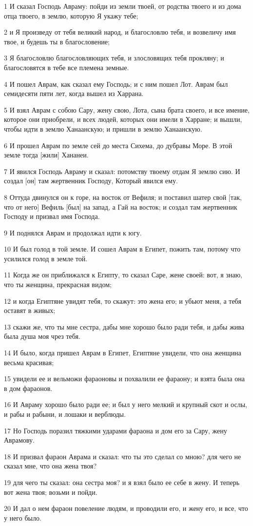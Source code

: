 \par 1 И сказал Господь Авраму: пойди из земли твоей, от родства твоего и из дома отца твоего, в землю, которую Я укажу тебе;
\par 2 и Я произведу от тебя великий народ, и благословлю тебя, и возвеличу имя твое, и будешь ты в благословение;
\par 3 Я благословлю благословляющих тебя, и злословящих тебя прокляну; и благословятся в тебе все племена земные.
\par 4 И пошел Аврам, как сказал ему Господь; и с ним пошел Лот. Аврам был семидесяти пяти лет, когда вышел из Харрана.
\par 5 И взял Аврам с собою Сару, жену свою, Лота, сына брата своего, и все имение, которое они приобрели, и всех людей, которых они имели в Харране; и вышли, чтобы идти в землю Ханаанскую; и пришли в землю Ханаанскую.
\par 6 И прошел Аврам по земле сей до места Сихема, до дубравы Море. В этой земле тогда [жили] Хананеи.
\par 7 И явился Господь Авраму и сказал: потомству твоему отдам Я землю сию. И создал [он] там жертвенник Господу, Который явился ему.
\par 8 Оттуда двинулся он к горе, на восток от Вефиля; и поставил шатер свой [так, что от него] Вефиль [был] на запад, а Гай на восток; и создал там жертвенник Господу и призвал имя Господа.
\par 9 И поднялся Аврам и продолжал идти к югу.
\par 10 И был голод в той земле. И сошел Аврам в Египет, пожить там, потому что усилился голод в земле той.
\par 11 Когда же он приближался к Египту, то сказал Саре, жене своей: вот, я знаю, что ты женщина, прекрасная видом;
\par 12 и когда Египтяне увидят тебя, то скажут: это жена его; и убьют меня, а тебя оставят в живых;
\par 13 скажи же, что ты мне сестра, дабы мне хорошо было ради тебя, и дабы жива была душа моя чрез тебя.
\par 14 И было, когда пришел Аврам в Египет, Египтяне увидели, что она женщина весьма красивая;
\par 15 увидели ее и вельможи фараоновы и похвалили ее фараону; и взята была она в дом фараонов.
\par 16 И Авраму хорошо было ради ее; и был у него мелкий и крупный скот и ослы, и рабы и рабыни, и лошаки и верблюды.
\par 17 Но Господь поразил тяжкими ударами фараона и дом его за Сару, жену Аврамову.
\par 18 И призвал фараон Аврама и сказал: что ты это сделал со мною? для чего не сказал мне, что она жена твоя?
\par 19 для чего ты сказал: она сестра моя? и я взял было ее себе в жену. И теперь вот жена твоя; возьми и пойди.
\par 20 И дал о нем фараон повеление людям, и проводили его, и жену его, и все, что у него было.

